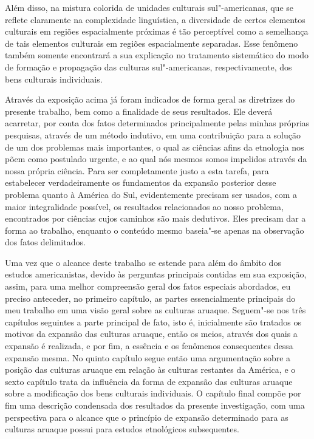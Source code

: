 Além disso, na mistura colorida de unidades culturais sul"-americanas,
que se reflete claramente na complexidade linguística, a diversidade de
certos elementos culturais em regiões espacialmente próximas é tão
perceptível como a semelhança de tais elementos culturais em regiões
espacialmente separadas. Esse fenômeno também somente encontrará a sua
explicação no tratamento sistemático do modo de formação e propagação
das culturas sul"-americanas, respectivamente, dos bens culturais
individuais.

Através da exposição acima já foram indicados de forma geral as
diretrizes do presente trabalho, bem como a finalidade de seus
resultados. Ele deverá acarretar, por conta dos fatos determinados
principalmente pelas minhas próprias pesquisas, através de um método
indutivo, em uma contribuição para a solução de um dos problemas mais
importantes, o qual as ciências afins da etnologia nos põem como
postulado urgente, e ao qual nós mesmos somos impelidos através da nossa
própria ciência. Para ser completamente justo a esta tarefa, para
estabelecer verdadeiramente os fundamentos da expansão posterior desse
problema quanto à América do Sul, evidentemente precisam ser usados,
com a maior integralidade possível, os resultados relacionados ao nosso
problema, encontrados por ciências cujos caminhos são mais dedutivos.
Eles precisam dar a forma ao trabalho, enquanto o conteúdo mesmo
baseia"-se apenas na observação dos fatos delimitados.

{Uma vez que o alcance deste trabalho se estende para além do âmbito dos
estudos americanistas, devido às perguntas principais contidas em sua
exposição, assim, para uma melhor compreensão geral dos fatos especiais
abordados, eu preciso anteceder, no primeiro capítulo, as partes
essencialmente principais do meu trabalho em uma visão geral sobre as
culturas aruaque. Seguem"-se nos três capítulos seguintes a parte
principal de fato, isto é, inicialmente são tratados os motivos da
expansão das culturas aruaque, então os meios, através dos quais a
expansão é realizada, e por fim, a essência e os fenômenos consequentes
dessa expansão mesma. No quinto capítulo segue então uma argumentação
sobre a posição das culturas aruaque em relação às culturas restantes da
América, e o sexto capítulo trata da influência da forma de expansão das
culturas aruaque sobre a modificação dos bens culturais individuais. O
capítulo final compõe por fim uma descrição condensada dos resultados da
presente investigação, com uma perspectiva para o alcance que o
princípio de expansão determinado para as culturas aruaque possui para
estudos etnológicos subsequentes.}

